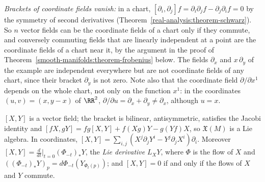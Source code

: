 \emph{Brackets of coordinate fields vanish:} in a chart, $[\partial_i, \partial_j]f = \partial_i\partial_jf - \partial_j\partial_if = 0$ by the symmetry of second derivatives
(Theorem~\ref{real-analysis:theorem-schwarz}). So $n$ vector fields can be the coordinate fields of a chart only if they commute, and conversely commuting fields that are linearly independent
at a point are the coordinate fields of a chart near it, by the argument in the proof of Theorem~\ref{smooth-manifolds:theorem-frobenius} below. The fields $\partial_x$ and $x\,\partial_y$ of the
example are independent everywhere but are not coordinate fields of any chart, since their bracket $\partial_y$ is not zero. Note also that the coordinate field $\partial/\partial x^1$ depends on the
whole chart, not only on the function $x^1$: in the coordinates $(u, v) = (x, y - x)$ of $\RR^2$, $\partial/\partial u = \partial_x + \partial_y \neq \partial_x$, although $u = x$.

\begin{proposition}\label{smooth-manifolds:proposition-bracket}
$[X, Y]$ is a vector field; the bracket is bilinear, antisymmetric, satisfies the Jacobi identity and $[fX, gY] = fg[X, Y] + f(Xg)Y - g(Yf)X$, so $\mathfrak{X}(M)$ is a Lie algebra. In coordinates,
$[X, Y] = \sum_{i,j}(X^j\partial_jY^i - Y^j\partial_jX^i)\partial_i$. Moreover $[X, Y] = \frac{d}{dt}\Big|_{t=0}(\Phi_{-t})_*Y$, the \emph{Lie derivative} $L_XY$,
where $\Phi$ is the flow of $X$ and $((\Phi_{-t})_*Y)_p = d\Phi_{-t}(Y_{\Phi_t(p)})$; and $[X, Y] = 0$ if and only if the flows of $X$ and $Y$ commute.
\end{proposition}

